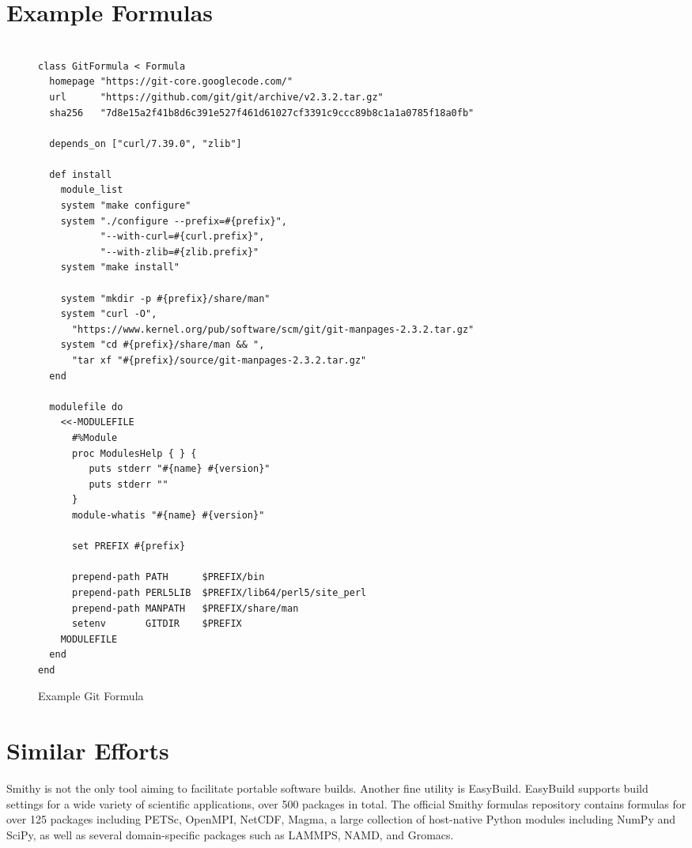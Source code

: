 \documentclass{acm_proc_article-sp}
\begin{document}
\section{Example Formulas}

\begin{figure*} %
\begin{verbatim}

class GitFormula < Formula
  homepage "https://git-core.googlecode.com/"
  url      "https://github.com/git/git/archive/v2.3.2.tar.gz"
  sha256   "7d8e15a2f41b8d6c391e527f461d61027cf3391c9ccc89b8c1a1a0785f18a0fb"

  depends_on ["curl/7.39.0", "zlib"]

  def install
    module_list
    system "make configure"
    system "./configure --prefix=#{prefix}",
           "--with-curl=#{curl.prefix}",
           "--with-zlib=#{zlib.prefix}"
    system "make install"

    system "mkdir -p #{prefix}/share/man"
    system "curl -O",
      "https://www.kernel.org/pub/software/scm/git/git-manpages-2.3.2.tar.gz"
    system "cd #{prefix}/share/man && ",
      "tar xf "#{prefix}/source/git-manpages-2.3.2.tar.gz"
  end

  modulefile do
    <<-MODULEFILE
      #%Module
      proc ModulesHelp { } {
         puts stderr "#{name} #{version}"
         puts stderr ""
      }
      module-whatis "#{name} #{version}"

      set PREFIX #{prefix}

      prepend-path PATH      $PREFIX/bin
      prepend-path PERL5LIB  $PREFIX/lib64/perl5/site_perl
      prepend-path MANPATH   $PREFIX/share/man
      setenv       GITDIR    $PREFIX
    MODULEFILE
  end
end
\end{verbatim}
\caption{Example Git Formula}
\end{figure*}

\section{Similar Efforts}

Smithy is not the only tool aiming to facilitate portable software builds.
Another fine utility is EasyBuild\cite{EasyBuild}. EasyBuild supports build
settings for a wide variety of scientific applications, over 500 packages in
total. The official Smithy formulas repository contains formulas for over 125
packages including PETSc, OpenMPI, NetCDF, Magma, a large collection of
host-native Python modules including NumPy and SciPy, as well as several
domain-specific packages such as LAMMPS, NAMD, and Gromacs.
\end{document}
